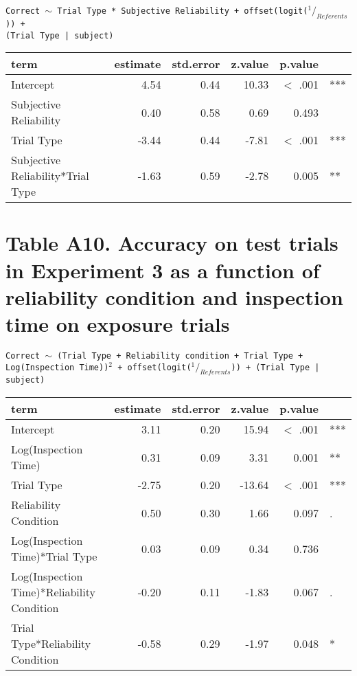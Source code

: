 \documentclass[oneside]{report}
\begin{document}
\texttt{Correct $\sim$ Trial Type * Subjective Reliability + offset(logit($^1/_{Referents}$)) + \\ (Trial Type | subject)}
\begin{table}[h]
\centering
\begin{tabular}{lrrrrl}
 term & estimate & std.error & z.value & p.value &  \\ 
  \hline
Intercept & 4.54 & 0.44 & 10.33 & $<$ .001 & *** \\ 
  Subjective Reliability & 0.40 & 0.58 & 0.69 & 0.493 &  \\ 
  Trial Type & -3.44 & 0.44 & -7.81 & $<$ .001 & *** \\ 
  Subjective Reliability*Trial Type & -1.63 & 0.59 & -2.78 & 0.005 & ** \\ 
   \hline
\end{tabular}
\label{tab:e3_acc_subj_rel}
\end{table}
\section*{Table A10. Accuracy on test trials in Experiment 3 as a function of reliability condition and inspection time on exposure trials}

\texttt{Correct $\sim$ (Trial Type + Reliability condition + Trial Type + \\ Log(Inspection Time))$^2$ + offset(logit($^1/_{Referents}$)) + (Trial Type | subject)}
\begin{table}[h]
\centering
\begin{tabular}{lrrrrl}
 term & estimate & std.error & z.value & p.value &  \\ 
  \hline
Intercept & 3.11 & 0.20 & 15.94 & $<$ .001 & *** \\ 
  Log(Inspection Time) & 0.31 & 0.09 & 3.31 & 0.001 & ** \\ 
  Trial Type & -2.75 & 0.20 & -13.64 & $<$ .001 & *** \\ 
  Reliability Condition & 0.50 & 0.30 & 1.66 & 0.097 & . \\ 
  Log(Inspection Time)*Trial Type & 0.03 & 0.09 & 0.34 & 0.736 &  \\ 
  Log(Inspection Time)*Reliability Condition & -0.20 & 0.11 & -1.83 & 0.067 & . \\ 
  Trial Type*Reliability Condition & -0.58 & 0.29 & -1.97 & 0.048 & * \\ 
   \hline
\end{tabular}
\label{tab:e3_acc_inspect}
\end{table}
\newpage
\end{document}
